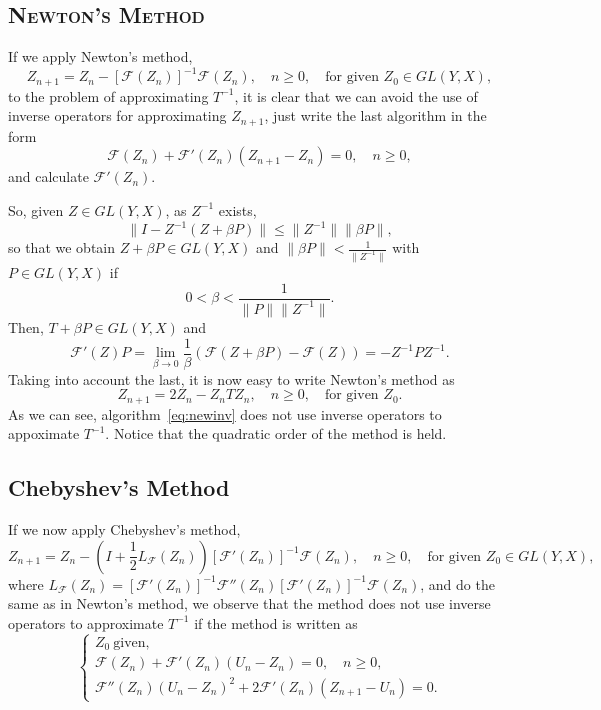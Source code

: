 \documentclass[11pt,twoside,letterpaper]{article} %
\begin{document}
\subsection{\scshape Newton's Method}

If we apply Newton's method,
\begin{equation*}
Z_{n+1}=Z_n-[\mathcal{F}(Z_n)]^{-1}\mathcal{F}(Z_n),\quad n\geq 0,
\quad\mbox{for given } Z_0\in GL(Y,X),
\end{equation*}
to the problem of approximating $T^{-1}$, it is clear that we can avoid the use of inverse operators for approximating $Z_{n+1}$, just write the last algorithm in the form
\begin{equation*}
\mathcal{F}(Z_n)+\mathcal{F}'(Z_n)(Z_{n+1}-Z_n)=0,\quad n\geq 0,
\end{equation*}
and calculate $\mathcal{F}'(Z_n)$.

So, given $Z\in GL(Y,X)$, as $Z^{-1}$ exists,
$$
\|I-Z^{-1}(Z+\beta P)\|\leq\|Z^{-1}\| \|\beta P\|,
$$
so that we obtain $Z+\beta P\in GL(Y,X)$ and
$\|\beta{P}\|<\frac{1}{\|Z^{-1}\|}$ with ${P}\in GL(Y,X)$ if
$$
0 < \beta < \dfrac{1}{\|{P}\|\|Z^{-1}\|}.
$$
Then, $T+\beta{P}\in GL(Y,X)$ and
$$
\mathcal{F}'(Z){P}=
\lim_{\beta\rightarrow 0}\frac{1}{\beta}
\left(\mathcal{F}(Z+\beta{P})-\mathcal{F}(Z)\right)
= -Z^{-1}{P} Z^{-1}.
$$
Taking into account the last, it is now easy to write Newton's method as
\begin{equation}
\label{eq:newinv}
Z_{n+1} = 2Z_n-Z_nTZ_n,\quad n\geq 0,
\quad\mbox{for given } Z_0.
\end{equation}
As we can see, algorithm~\eqref{eq:newinv} does not use inverse operators to appoximate $T^{-1}$. Notice that the quadratic order of the method is held.

\subsection{Chebyshev's Method}

If we now apply Chebyshev's method,
\begin{equation*}
Z_{n+1} = Z_n-\left(I+\frac{1}{2}L_{\mathcal{F}}(Z_n)\right)[\mathcal{F}'(Z_n)]^{-1}\mathcal{F}(Z_n),\quad n\geq 0,
\quad\mbox{for given } Z_0\in GL(Y,X),
\end{equation*}
where $L_{\mathcal{F}}(Z_n)=[\mathcal{F}'(Z_n)]^{-1}\mathcal{F}''(Z_n)[\mathcal{F}'(Z_n)]^{-1}\mathcal{F}(Z_n)$, and do the same as in Newton's method, we observe that the method does not use inverse operators to approximate $T^{-1}$ if the method is written as
\begin{equation*}
\left\{
\begin{array}{l}
Z_0\ \text{given}, \\[1ex]
\mathcal{F}(Z_n)+\mathcal{F}'(Z_n)(U_n-Z_n)=0,\quad n\geq 0,\\[1ex]
\mathcal{F}''(Z_n)(U_n-Z_n)^2+2\mathcal{F}'(Z_n)(Z_{n+1}-U_n)=0.
\end{array}
\right.
\end{equation*}
\end{document}
